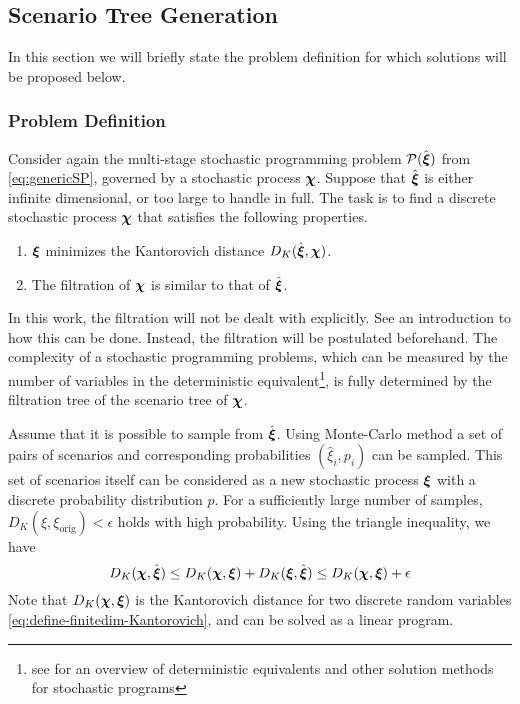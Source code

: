 \subsection{Scenario Tree Generation}
In this section we will briefly state the problem definition for which solutions will be proposed below.
\subsubsection{Problem Definition}
Consider again the multi-stage stochastic programming problem $\mathcal{P}(\hat{\boldsymbol\xi})$ from \eqref{eq:genericSP}, governed by a stochastic process $\boldsymbol\chi$.
Suppose that $\hat{\boldsymbol\xi}$ is either infinite dimensional, or too large to handle in full.
The task is to find a discrete stochastic process $\boldsymbol\chi$ that satisfies the following properties.
\begin{enumerate}
\item $\boldsymbol\xi$ minimizes the Kantorovich distance $D_K(\hat{\boldsymbol\xi},\boldsymbol\chi)$.
\item The filtration of $\boldsymbol\chi$ is similar to that of $\hat{\boldsymbol\xi}$.
\end{enumerate}
In this work, the filtration will not be dealt with explicitly.
See  an introduction to how this can be done.
Instead, the filtration will be postulated beforehand.
The complexity of a stochastic programming problems, which can be measured by the number of variables in the deterministic equivalent\footnote{see  for an overview of deterministic equivalents and other solution methods for stochastic programs}, is fully determined by the filtration tree of the scenario tree of $\boldsymbol\chi$.

Assume that it is possible to sample from $\hat{\boldsymbol\xi}$.
Using Monte-Carlo method a set of pairs of scenarios and corresponding probabilities $(\hat{\xi}_i,p_i)$ can be sampled.
This set of scenarios itself can be considered as a new stochastic process $\boldsymbol\xi$ with a discrete probability distribution $p$.
For a sufficiently large number of samples,  $D_K(\xi,\xi_{\mathrm{orig}})<\epsilon$ holds with high probability.
Using the triangle inequality, we have
\begin{equation}
  \label{eq:triangle-montecarlo-kantoro}
  D_K(\boldsymbol\chi,\hat{\boldsymbol\xi}) \leq  D_K(\boldsymbol\chi, \boldsymbol\xi) + D_K(\boldsymbol\xi,\hat{\boldsymbol\xi})\leq D_K(\boldsymbol\chi,\boldsymbol\xi)+ \epsilon
\end{equation}
Note that $D_K(\boldsymbol\chi,\boldsymbol\xi)$ is the Kantorovich distance for two discrete random variables \eqref{eq:define-finitedim-Kantorovich}, and can be solved as a linear program.

